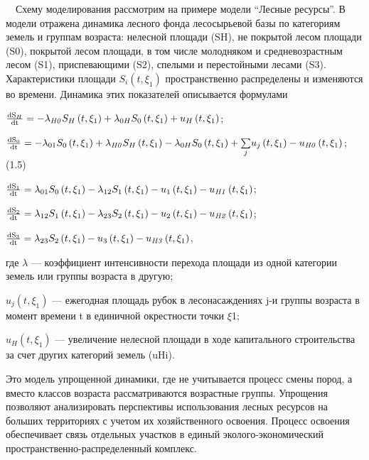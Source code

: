 \documentclass{report}
\newcommand\normalsubformula[1]{\text{\mathversion{normal}$#1$}}
\begin{document}
\ \ Схему моделирования рассмотрим на примере модели “Лесные ресурсы”. В модели отражена динамика лес\-ного фонда
лесосырьевой базы по категориям земель и группам возраста: нелесной площади (SH), не покрытой лесом площади (S0),
покрытой лесом площади, в том числе молодняком и средневозрастным лесом (S1), приспевающими (S2), спелыми и
перестойными лесами (S3). Характеристики площади  $S_i\left(t,\xi _1\right)$ прост\-ранственно распределены и
изменяются во времени. Динамика этих показателей описывается формулами

 $\frac{\normalsubformula{\text{dS}}_H}{\normalsubformula{\text{dt}}}=-\lambda _{\mathit{H0}}S_H\left(t,\xi
_1\right)+\lambda _{0H}S_0\left(t,\xi _1\right)+u_H\left(t,\xi _1\right)$;

 $\frac{\normalsubformula{\text{dS}}_0}{\normalsubformula{\text{dt}}}=-\lambda _{01}S_0\left(t,\xi _1\right)+\lambda
_{\mathit{H0}}S_H\left(t,\xi _1\right)-\lambda _{0H}S_0\left(t,\xi _1\right)+\underset j{\sum }u_j\left(t,\xi
_1\right)-u_{\mathit{H0}}\left(t,\xi _1\right)$;  (1.5)

 $\frac{\normalsubformula{\text{dS}}_1}{\normalsubformula{\text{dt}}}=\lambda _{01}S_0\left(t,\xi _1\right)-\lambda
_{12}S_1\left(t,\xi _1\right)-u_1\left(t,\xi _1\right)-u_{\mathit{H1}}\left(t,\xi _1\right)$;

 $\frac{\normalsubformula{\text{dS}}_2}{\normalsubformula{\text{dt}}}=\lambda _{12}S_1\left(t,\xi _1\right)-\lambda
_{23}S_2\left(t,\xi _1\right)-u_2\left(t,\xi _1\right)-u_{\mathit{H2}}\left(t,\xi _1\right)$;

 $\frac{\normalsubformula{\text{dS}}_3}{\normalsubformula{\text{dt}}}=\lambda _{23}S_2\left(t,\xi
_1\right)-u_3\left(t,\xi _1\right)-u_{\mathit{H3}}\left(t,\xi _1\right)$,

где ${\lambda}$ — коэффициент интенсивности перехода площади из одной категории земель или группы возраста в другую;

 $u_j\left(t,\xi _1\right)$ — ежегодная площадь рубок в лесонасаждениях j{}-и группы возраста в момент времени t в
единичной окрест\-ности точки ${\xi}$1;

 $u_H\left(t,\xi _1\right)$ — увеличение нелесной площади в ходе капитального строительства за счет других категорий
земель (uHi).

Это модель упрощенной динамики, где не учитывается процесс смены пород, а вместо классов воз\-раста рассматриваются
возрастные группы. Упрощения позво\-ляют анализировать перспективы использования лесных ресурсов на больших
терри\-ториях с учетом их хозяйственного освоения. Процесс освоения обеспечивает связь отдельных участков в единый
эколого-экономический пространственно-распределенный комплекс.
\end{document}
